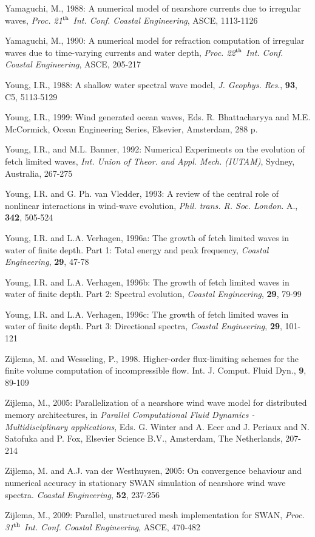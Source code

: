 \documentclass[12pt]{book}
\begin{document}
\begin{thebibliography}{10}
Yamaguchi, M., 1988: A numerical model of nearshore currents due to irregular waves, {\it Proc. 21$^{{\rm th}}$ Int.
Conf. Coastal Engineering}, ASCE, 1113-1126

Yamaguchi, M., 1990: A numerical model for refraction computation of irregular waves due to time-varying
currents and water depth, {\it Proc. 22$^{{\rm th}}$ Int. Conf. Coastal Engineering}, ASCE, 205-217

Young, I.R., 1988: A shallow water spectral wave model, {\it J. Geophys. Res}., {\bf 93}, C5, 5113-5129

Young, I.R., 1999: Wind generated ocean waves, Eds. R. Bhattacharyya and M.E. McCormick, Ocean Engineering Series,
Elsevier, Amsterdam, 288 p.

Young, I.R., and M.L. Banner, 1992: Numerical Experiments on the evolution of fetch limited waves, {\it Int.
Union of Theor. and Appl. Mech. (IUTAM)}, Sydney, Australia, 267-275

Young, I.R. and G. Ph. van Vledder, 1993: A review of the central role of nonlinear interactions in wind-wave evolution,
{\it Phil. trans. R. Soc. London}. A., {\bf 342}, 505-524

Young, I.R. and L.A. Verhagen, 1996a: The growth of fetch limited waves in water of finite depth. Part 1:
Total energy and peak frequency, {\it Coastal Engineering}, {\bf 29}, 47-78

Young, I.R. and L.A. Verhagen, 1996b: The growth of fetch limited waves in water of finite depth. Part 2:
Spectral evolution, {\it Coastal Engineering}, {\bf 29}, 79-99

Young, I.R. and L.A. Verhagen, 1996c: The growth of fetch limited waves in water of finite depth. Part 3:
Directional spectra, {\it Coastal Engineering}, {\bf 29}, 101-121

Zijlema, M. and Wesseling, P., 1998. Higher-order flux-limiting schemes for the finite volume
  computation of incompressible flow. Int. J. Comput. Fluid Dyn., {\bf 9}, 89-109

Zijlema, M., 2005: Parallelization of a nearshore wind wave model for distributed memory architectures,
in {\it Parallel Computational Fluid Dynamics - {M}ultidisciplinary applications},
Eds. G. Winter and A. Ecer and J. Periaux and N. Satofuka and P. Fox,
Elsevier Science B.V., Amsterdam, The Netherlands, 207-214

Zijlema, M. and A.J. van der Westhuysen, 2005: On convergence behaviour and numerical accuracy in stationary
SWAN simulation of nearshore wind wave spectra. {\it Coastal Engineering}, {\bf 52}, 237-256

Zijlema, M., 2009: Parallel, unstructured mesh implementation for SWAN,
{\it Proc. 31$^{{\rm th}}$ Int. Conf. Coastal Engineering}, ASCE, 470-482

\end{thebibliography}
\end{document}
